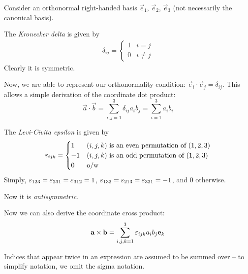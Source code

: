 \documentclass{../../template/note}
\begin{document}
    Consider an orthonormal right-handed basis \(\vec e_1\), \(\vec e_2\), \(\vec e_3\) (not necessarily the canonical basis).

    \begin{definition}
        The \emph{Kronecker delta} is given by
        \begin{align*}
            \delta_{ij} = 
            \begin{cases}
                1 & i = j \\
                0 & i \neq j
            \end{cases}
        \end{align*}
        Clearly it is symmetric.
    \end{definition}
    Now, we are able to represent our orthonormality condition: \(\vec e_i \cdot \vec e_j = \delta_{ij}\). This allows a simple derivation of the coordinate dot product:
    \[
        \vec a \cdot \vec b = \sum_{i,j=1}^3 \delta_{ij}a_ib_j = \sum_{i=1}^3 a_ib_i
    \]
    \begin{definition}
        The \emph{Levi-Civita epsilon} is given by
        \begin{align*}
            \varepsilon_{ijk} =
            \begin{cases}
                1 & (i, j, k) \text{ is an even permutation of } (1, 2, 3) \\
                -1 & (i, j, k) \text{ is an odd permutation of } (1, 2, 3) \\
                0 & \text{o/w}
            \end{cases}
        \end{align*}
        Simply, \(\varepsilon_{123} = \varepsilon_{231} = \varepsilon_{312} = 1\), \(\varepsilon_{132} = \varepsilon_{213} = \varepsilon_{321} = -1\), and 0 otherwise.

        Now it is \emph{antisymmetric}.
    \end{definition}
    Now we can also derive the coordinate cross product:
    \[
        \vec a \times \vec b = \sum_{i,j,k=1}^3 \lv{ijk} a_i b_j \vec e_k
    \]

    \begin{definition}
        Indices that appear twice in an expression are assumed to be summed over -- to simplify notation, we omit the sigma notation.
    \end{definition}
    
\end{document}
